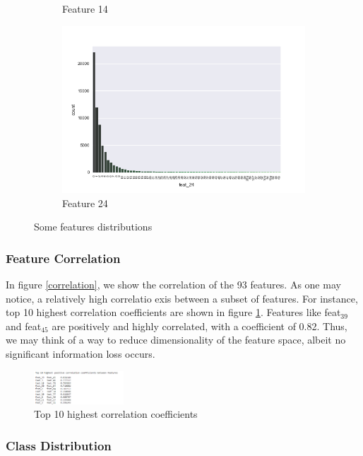 \documentclass[a4paper,english,12pt, twocolumn]{article}
\begin{document}
\begin{figure}[H]
\begin{subfigure}{0.22\textwidth}
		\caption{Feature 14}
	\end{subfigure}	
	\begin{subfigure}{0.22\textwidth}
		\includegraphics[width=\textwidth]{feat_24}
		\caption{Feature 24}
	\end{subfigure}	
	\caption{Some features distributions}
\end{figure}


\subsubsection{Feature Correlation}

In figure \ref{correlation}, we show the correlation of the 93 features. As one may notice, a relatively high correlatio exis between a subset of features. For instance, top 10 highest correlation coefficients are shown in  figure \ref{top10}. Features like feat$_39$ and feat$_45$ are positively and highly correlated, with a coefficient of 0.82. Thus, we may think of a way to reduce dimensionality of the feature space, albeit no significant information loss occurs.



\begin{figure}[H]
	\centering
	\includegraphics[width=0.3\textwidth,keepaspectratio]{top10_corr}
	\caption{Top 10 highest correlation coefficients}
	\label{top10}
\end{figure}

\subsubsection{Class Distribution}
\end{document}
